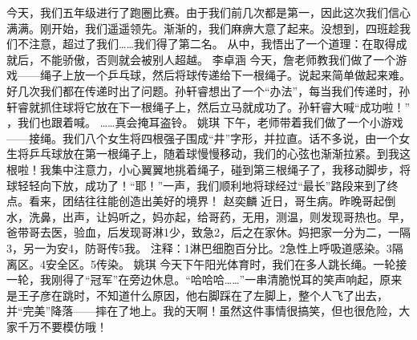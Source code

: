 {}今天，我们五年级进行了跑圈比赛。由于我们前几次都是第一，因此这次我们信心满满。刚开始，我们遥遥领先。渐渐的，我们麻痹大意了起来。没想到，四班趁我们不注意，超过了我们……我们得了第二名。 从中，我悟出了一个道理：在取得成就后，不能骄傲，否则就会被别人超越。\markdownRendererInterblockSeparator
{}\markdownRendererInterblockSeparator
{}李卓涵\markdownRendererInterblockSeparator
{}今天，詹老师教我们做了一个游戏——绳子上放一个乒乓球，然后将球传递给下一根绳子。说起来简单做起来难。好几次我们都在传递时出了问题。孙轩睿想出了一个“办法”，每当我们传递时，孙轩睿就抓住球将它放在下一根绳子上，然后立马就成功了。孙轩睿大喊“成功啦！” ，我们也跟着喊。 ……真会掩耳盗铃。\markdownRendererInterblockSeparator
{}\markdownRendererInterblockSeparator
{}姚琪\markdownRendererInterblockSeparator
{}下午，老师带着我们做了一个小游戏——接绳。我们八个女生将四根强子围成“井”字形，并拉直。话不多说，由一个女生将乒乓球放在第一根绳子上，随着球慢慢移动，我们的心弦也渐渐拉紧。到我这根啦！我集中注意力，小心翼翼地挑着绳子，碰到第三根绳子了，我移动脚步，将球轻轻向下放，成功了！“耶！”一声，我们顺利地将球经过“最长”路段来到了终点。看来，团结往往能创造出美好的境界！\markdownRendererInterblockSeparator
{}\markdownRendererInterblockSeparator
{}赵奕麟\markdownRendererInterblockSeparator
{}近日，哥生病。昨晚哥起倒水，洗鼻，出声，让妈听之，妈亦起，给哥药，无用，测温，则发现哥热也。早，爸带哥去医，验血，后发现哥淋1少，致急2，后之在家休。妈把家一分为二，一隔3，另一为安4，防哥传5我。\markdownRendererInterblockSeparator
{}注释：1淋巴细胞百分比。2急性上呼吸道感染。3隔离区。4安全区。5传染。\markdownRendererInterblockSeparator
{}\markdownRendererInterblockSeparator
{}姚琪\markdownRendererInterblockSeparator
{}今天下午阳光体育时，我们在多人跳长绳。一轮接一轮，我刚得了“冠军”在旁边休息。“哈哈哈……”一串清脆悦耳的笑声响起，原来是王子彦在跳时，不知道什么原因，他右脚踩在了左脚上，整个人飞了出去，并“完美”降落——摔在了地上。我的天啊！虽然这件事情很搞笑，但也很危险，大家千万不要模仿哦！\markdownRendererDocumentEnd